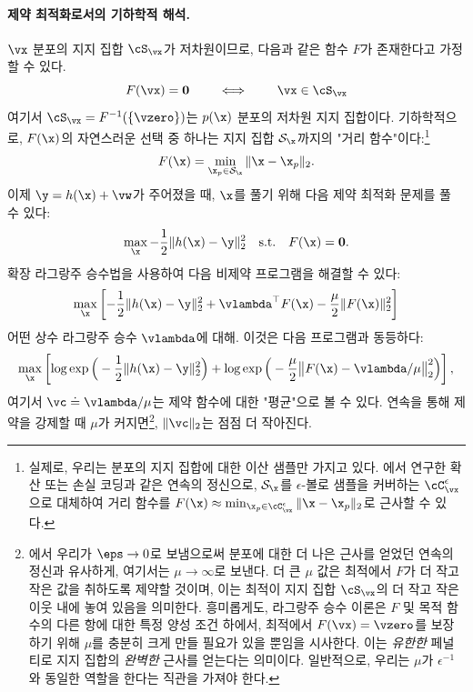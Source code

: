 \documentclass[../../book-main_ko.tex]{subfiles}
\begin{document}
\paragraph{제약 최적화로서의 기하학적 해석.}

\(\vx\) 분포의 지지 집합 $\cS_{\vx}$가 저차원이므로, 다음과 같은 함수 $F$가 존재한다고 가정할 수 있다.
\begin{equation}
  F(\vx) = \boldsymbol{0} \qquad \iff \qquad \vx \in \cS_{\vx}
\end{equation}
여기서 $\cS_{\vx} = F^{-1}(\{\vzero\})$는 $p(\x)$ 분포의 저차원 지지 집합이다. 기하학적으로, $F(\x)$의 자연스러운 선택 중 하나는 지지 집합 $\mathcal{S}_{\x}$까지의 "거리 함수"이다:\footnote{실제로, 우리는 분포의 지지 집합에 대한 이산 샘플만 가지고 있다. 에서 연구한 확산 또는 손실 코딩과 같은 연속의 정신으로, $\mathcal{S}_{\x}$를 $\epsilon$-볼로 샘플을 커버하는 $\cC_{\vx}^{\epsilon}$으로 대체하여 거리 함수를 $F(\x) \approx \min_{\x_p \in \cC_{\vx}^{\epsilon}} \|\x - \x_p\|_2$로 근사할 수 있다.}
\begin{equation}
    F(\x) = \min_{\x_p \in \mathcal{S}_{\x}} \|\x - \x_p\|_2.
\end{equation}
이제 $\y = h(\x) +\vw$가 주어졌을 때, $\x$를 풀기 위해 다음 제약 최적화 문제를 풀 수 있다:
\begin{equation}
    \max_{\x} - \frac{1}{2}\|h(\x) - \y\|_2^2 \quad \mbox{s.t.} \quad F(\x) = \boldsymbol{0}.
\end{equation}
확장 라그랑주 승수법을 사용하여 다음 비제약 프로그램을 해결할 수 있다:
\begin{equation}
   \max_{\x} \left[-\frac{1}{2}\|h(\x) - \y\|_2^2  + \vlambda^{\top} F(\x) - \frac{\mu}{2} \|F(\x)\|_2^2\right]
\end{equation}
어떤 상수 라그랑주 승수 $\vlambda$에 대해.
이것은 다음 프로그램과 동등하다:
\begin{equation}\label{eq:lagrange_multiplier_continuation}
\max_{\x} \left[\log \exp\Big(- \frac{1}{2}\|h(\x) - \y\|_2^2\Big) + \log \exp\Big( - \frac{\mu}{2} \big\|F(\x) - \vlambda/\mu\big\|_2^2\Big)\right],
\end{equation}
여기서 $\vc \doteq {\vlambda}/{\mu}$는 제약 함수에 대한 "평균"으로 볼 수 있다. 연속을 통해 제약을 강제할 때 $\mu$가 커지면\footnote{에서 우리가 $\eps \to 0$로 보냄으로써 분포에 대한 더 나은 근사를 얻었던 연속의 정신과 유사하게, 여기서는 $\mu \to \infty$로 보낸다. 더 큰 $\mu$ 값은 최적에서 $F$가 더 작고 작은 값을 취하도록 제약할 것이며, 이는 최적이 지지 집합 $\cS_{\vx}$의 더 작고 작은 이웃 내에 놓여 있음을 의미한다. 흥미롭게도, 라그랑주 승수 이론은 $F$ 및 목적 함수의 다른 항에 대한 특정 양성 조건 하에서, 최적에서 $F(\vx) = \vzero$를 보장하기 위해 $\mu$를 충분히 크게 만들 필요가 있을 뿐임을 시사한다. 이는 \textit{유한한} 페널티로 지지 집합의 \textit{완벽한} 근사를 얻는다는 의미이다. 일반적으로, 우리는 $\mu$가 $\epsilon^{-1}$와 동일한 역할을 한다는 직관을 가져야 한다.}, $\|\vc\|_2$는 점점 더 작아진다.
\end{document}
